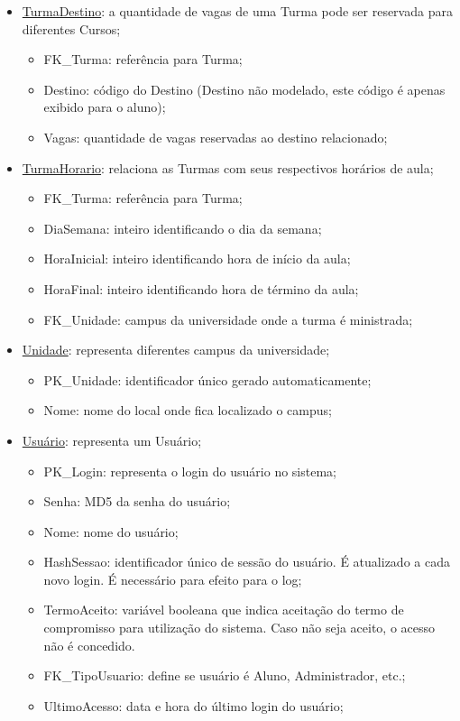 \documentclass[graduacao,brazil]{ThesisPUC}
\begin{document}
\begin{itemize}
	\item \underline{TurmaDestino}: a quantidade de vagas de uma Turma pode ser reservada para diferentes Cursos;
	\begin{itemize}
		\item FK\_Turma: referência para Turma;
		\item Destino: código do Destino (Destino não modelado, este código é apenas exibido para o aluno);
		\item Vagas: quantidade de vagas reservadas ao destino relacionado;
	\end{itemize}

	\item \underline{TurmaHorario}: relaciona as Turmas com seus respectivos horários de aula;
	\begin{itemize}
		\item FK\_Turma: referência para Turma;
		\item DiaSemana: inteiro identificando o dia da semana;
		\item HoraInicial: inteiro identificando hora de início da aula;
		\item HoraFinal: inteiro identificando hora de término da aula;
		\item FK\_Unidade: campus da universidade onde a turma é ministrada;
	\end{itemize}

	\item \underline{Unidade}: representa diferentes campus da universidade;
	\begin{itemize}
		\item PK\_Unidade: identificador único gerado automaticamente;
		\item Nome: nome do local onde fica localizado o campus;
	\end{itemize}

	\item \underline{Usuário}: representa um Usuário;
	\begin{itemize}
		\item PK\_Login: representa o login do usuário no sistema;
		\item Senha: MD5 da senha do usuário;
		\item Nome: nome do usuário;
		\item HashSessao: identificador único de sessão do usuário. É atualizado a cada novo login. É necessário para efeito para o log;
		\item TermoAceito: variável booleana que indica aceitação do termo de compromisso para utilização do sistema. Caso não seja aceito, o acesso não é concedido.
		\item FK\_TipoUsuario: define se usuário é Aluno, Administrador, etc.;
		\item UltimoAcesso: data e hora do último login do usuário;
	\end{itemize}

\end{itemize}
\end{document}
